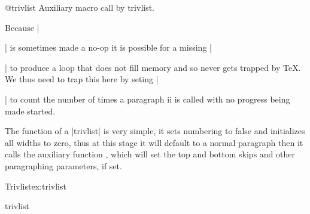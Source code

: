 \begin{texcode}{}{}
 \begin{docCommand}{@trivlist}{}
   Auxiliary macro call by trivlist.
 \end{docCommand}
  Because |\par| is sometimes made a no-op it is possible for a missing
 |\item| to produce a loop that does not fill memory and so never gets
 trapped by \TeX.  We thus need to trap this here by seting |\par| to
 count the number of times a paragraph ii is called with no progress
 being made started.
    \begin{teXXX}
\def\@trivlist{%
  \if@noskipsec \leavevmode \fi
  \@topsepadd \topsep
  \ifvmode
    \advance\@topsepadd \partopsep
  \else
    \unskip \par
  \fi
  \if@inlabel
    \@noparitemtrue
    \@noparlisttrue
  \else
    \if@newlist \@noitemerr \fi
    \@noparlistfalse
    \@topsep \@topsepadd
  \fi
  \advance\@topsep \parskip
  \leftskip \z@skip
  \rightskip \@rightskip
  \parfillskip \@flushglue
  \par@deathcycles \z@
  \@setpar{\if@newlist
             \advance\par@deathcycles \@ne
             \ifnum \par@deathcycles >\@m
               \@noitemerr
               {\@@par}%
             \fi
           \else
             {\@@par}%
           \fi}%
  \global \@newlisttrue
  \@outerparskip \parskip}
    \end{teXXX}

The function of a |trivlist| is very simple, it sets numbering to false and initializes all  widths to zero, thus at this stage it will default to a normal paragraph then it calls the auxiliary function , which will set
the top and bottom skips and other paragraphing parameters, if set.

\begin{texexample}{Trivlist}{ex:trivlist}
\lorem
\begin{trivlist}
\item[] \lorem

\end{trivlist}
\lorem

\end{texexample}

 \begin{docCommand}{trivlist} {  }
 \end{docCommand} 
     \begin{teX}
\def\trivlist{%
  \parsep\parskip
  \@nmbrlistfalse
  \@trivlist
  \labelwidth\z@
  \leftmargin\z@
  \itemindent\z@
    \end{teX}


\end{texcode}
